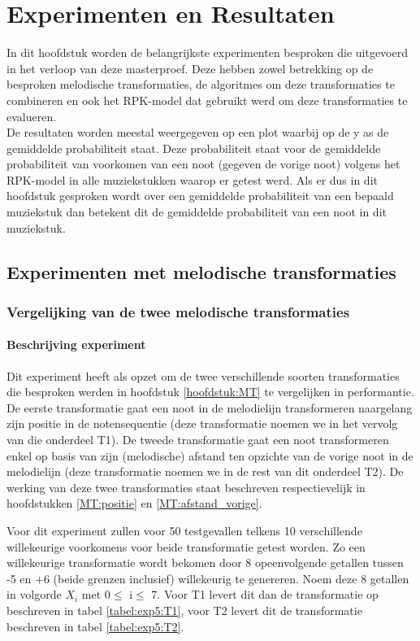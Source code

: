 \chapter{Experimenten en Resultaten}
\label{hoofdstuk:ER}
In dit hoofdstuk worden de belangrijkste experimenten besproken die uitgevoerd in het verloop van deze masterproef. Deze hebben zowel betrekking op de besproken melodische transformaties, de algoritmes om deze transformaties te combineren en ook het RPK-model dat gebruikt werd om deze transformaties te evalueren.\\
De resultaten worden meestal weergegeven op een plot waarbij op de y as de gemiddelde probabiliteit staat. Deze probabiliteit staat voor de gemiddelde probabiliteit van voorkomen van een noot (gegeven de vorige noot) volgens het RPK-model in alle muziekstukken waarop er getest werd. Als er dus in dit hoofdstuk gesproken wordt over een gemiddelde probabiliteit van een bepaald muziekstuk dan betekent dit de gemiddelde probabiliteit van een noot in dit muziekstuk.

\section{Experimenten met melodische transformaties}
\subsection{Vergelijking van de twee melodische transformaties}
\label{experiment:5}
\subsubsection{Beschrijving experiment}
Dit experiment heeft als opzet om de twee verschillende soorten transformaties die besproken werden in hoofdstuk \ref{hoofdstuk:MT} te vergelijken in performantie. De eerste transformatie gaat een noot in de melodielijn transformeren naargelang zijn positie in de notensequentie (deze transformatie noemen we in het vervolg van die onderdeel T1). De tweede transformatie gaat een noot transformeren enkel op basis van zijn (melodische) afstand ten opzichte van de vorige noot in de melodielijn (deze transformatie noemen we in de rest van dit onderdeel T2). De werking van deze twee transformaties staat beschreven respectievelijk in hoofdstukken \ref{MT:positie} en \ref{MT:afstand_vorige}.

Voor dit experiment zullen voor 50 testgevallen telkens 10 verschillende willekeurige voorkomens voor beide transformatie getest worden. Zo een willekeurige transformatie wordt bekomen door 8 opeenvolgende getallen tussen -5 en +6 (beide grenzen inclusief) willekeurig te genereren. Noem deze 8 getallen in volgorde $X_{i}$ met 0$\leq$ i$\leq$ 7. Voor T1 levert dit dan de transformatie op beschreven in tabel \ref{tabel:exp5:T1}, voor T2 levert dit de transformatie beschreven in tabel \ref{tabel:exp5:T2}.

